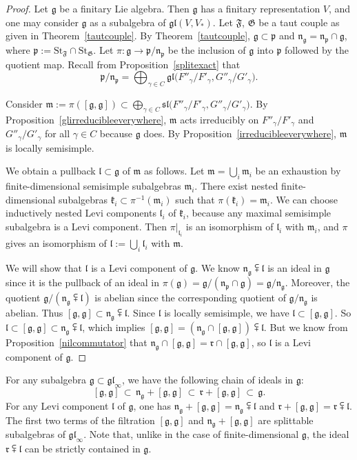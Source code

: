 \documentclass{article}
\newcommand {\St} {\mathrm{St}}
\def\gl{\mathfrak {gl}}
\def\g{\mathfrak {g}}
\def\l{\mathfrak {l}}
\def\m{\mathfrak {m}}
\def\n{\mathfrak {n}}
\def\p{\mathfrak {p}}
\def\sl{\mathfrak{sl}}
\def\k{\mathfrak{k}}
\def\r{\mathfrak{r}}
\def\F{\mathfrak{F}}
\def\G{\mathfrak{G}}
\begin{document}
\begin{proof}
Let $\g$ be a finitary Lie algebra.  
Then $\g$ has a finitary representation $V$, and one may consider $\g$ as a subalgebra of $\gl(V,V_*)$.  Let $\F$, $\G$ be a taut couple as given in Theorem~\ref{tautcouple}.  By Theorem~\ref{tautcouple}, $\g \subset \p$ and $\n_\g = \n_\p \cap \g$, where $\p := \St_\F \cap \St_\G$.  Let $\pi \colon \g \rightarrow {\p} / {\n_\p}$ be the inclusion of $\g$ into $\p$ followed by the quotient map.  
Recall from Proposition~\ref{splitexact} that $$\p /  \n_\p = \bigoplus_{\gamma \in C}\gl\big({F''_\gamma} / {F'_\gamma} , {G''_\gamma} / {G'_\gamma}\big).$$  

Consider $\m := \pi([\g,\g]) \subset \bigoplus_{\gamma \in C} \sl\big({F''_\gamma} / {F'_\gamma} , {G''_\gamma} / {G'_\gamma}\big)$.  By Proposition~\ref{glirreducibleeverywhere}, $\m$ acts irreducibly on ${F''_\gamma} / {F'_\gamma}$ and ${G''_\gamma} / {G'_\gamma}$ for all $\gamma \in C$ because $\g$ does.  By Proposition~\ref{irreducibleeverywhere}, $\m$ is locally semisimple.   

We obtain a pullback $\l \subset \g$ of $\m$ as follows.  Let $\m = \bigcup_i \m_i$ be an exhaustion by finite-dimensional semisimple subalgebras $\m_i$.  There exist nested finite-dimensional subalgebras $\k_i \subset \pi^{-1} (\m_i)$ such that $\pi(\k_i) = \m_i$.  We can choose inductively nested Levi components $\l_i$ of $\k_i$, because any maximal semisimple subalgebra is a Levi component.  Then $\pi|_{\l_i}$ is an isomorphism of $\l_i$ with $\m_i$, and $\pi$ gives an isomorphism of $\l := \bigcup_i \l_i$ with $\m$.

We will show that $\l$ is a Levi component of $\g$.  We know $\n_\g \subsetplus \l$ is an ideal in $\g$ since it is the pullback of an ideal in $\pi(\g) = {\g} / (\n_\p \cap \g) = {\g} / {\n_\g}$.  Moreover, the quotient ${\g} / {(\n_\g \subsetplus \l)}$ is abelian since the corresponding quotient of ${\g} / {\n_\g}$ is abelian.  Thus $[\g,\g] \subset \n_\g \subsetplus \l$.  Since $\l$ is locally semisimple, we have $\l \subset [\g,\g]$.  So $\l \subset [\g,\g] \subset \n_\g \subsetplus \l$, which implies $[\g,\g] = (\n_\g \cap [\g,\g]) \subsetplus \l$.  But we know from Proposition~\ref{nilcommutator} that $\n_\g \cap [\g,\g] = \r \cap [\g,\g]$, so $\l$ is a Levi component of $\g$.
\end{proof}


For any subalgebra $\g \subset \gl_\infty$, we have the following chain of ideals in $\g$:
$$ [\g,\g] \, \subset \, \n_\g + [\g,\g] \, \subset \, \r + [\g,\g] \, \subset \, \g.$$
For any Levi component $\l$ of $\g$, one has $\n_\g + [\g,\g] = \n_\g \subsetplus \l$ and $\r + [\g,\g] = \r \subsetplus \l$.  The first two terms of the filtration $[\g,\g]$ and $\n_\g + [\g,\g]$ are splittable subalgebras of $\gl_\infty$.  Note that, unlike in the case of finite-dimensional $\g$, the ideal $\r \subsetplus \l$ can be strictly contained in $\g$.
\end{document}
